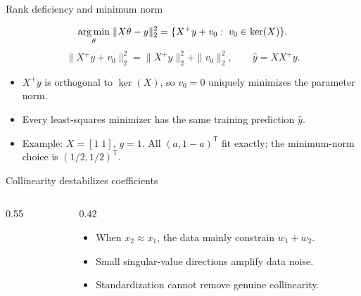 \begin{frame}{Rank deficiency and minimum norm}
\begin{definitionbox}
\[
 \underset{\theta}{\operatorname*{arg\,min}}\;\|X\theta-y\|_2^2
 =\{X^+y+v_0:\;v_0\in\ker(X)\}.
\]
\[
 \|X^+y+v_0\|_2^2=\|X^+y\|_2^2+\|v_0\|_2^2,
 \qquad \widehat y=XX^+y.
\]
\end{definitionbox}
\small
\begin{itemize}\setlength{\itemsep}{7pt}
\item $X^+y$ is orthogonal to $\ker(X)$, so $v_0=0$ uniquely minimizes the parameter norm.
\item Every least-squares minimizer has the same training prediction $\widehat y$.
\item Example: $X=[1\;1]$, $y=1$. All $(a,1-a)^{\mathsf T}$ fit exactly; the minimum-norm choice is $(1/2,1/2)^{\mathsf T}$.
\end{itemize}
\end{frame}

\begin{frame}{Collinearity destabilizes coefficients}
\begin{columns}[T,onlytextwidth]
\begin{column}{0.55\textwidth}\end{column}
\begin{column}{0.42\textwidth}\small
\begin{itemize}\setlength{\itemsep}{13pt}
\item When $x_2\approx x_1$, the data mainly constrain $w_1+w_2$.
\item Small singular-value directions amplify data noise.
\item Standardization cannot remove genuine collinearity.
\end{itemize}
\end{column}\end{columns}
\end{frame}

